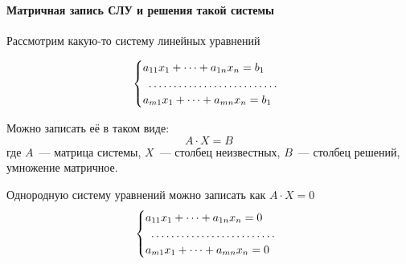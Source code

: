 \documentclass[12pt]{../../../notes}
\begin{document}
\paragraph{Матричная запись СЛУ и решения такой системы}
\begin{defn}\label{defn:matrslineq}
Рассмотрим какую-то систему линейных уравнений

\begin{equation}
  \begin{cases}
    a_{11} x_1 + \dotsb +a_{1n} x_n = b_1\\
    \hdotsfor{1} \\
    a_{m1} x_1 + \dotsb +a_{mn} x_n = b_1
  \end{cases}
  \label{eq:sleq}
\end{equation}

Можно записать её в таком виде:
\[
  A\cdot X = B
\]
где $A$~--- матрица системы, $X$~--- столбец неизвестных, $B$~--- столбец решений, умножение
матричное.

Однородную систему уравнений можно записать как $A\cdot X = 0$
\begin{equation}
  \begin{cases}
    a_{11} x_1 + \dotsb +a_{1n} x_n = 0\\
    \hdotsfor{1} \\
    a_{m1} x_1 + \dotsb +a_{mn} x_n = 0
  \end{cases}
  \label{eq:hsleq}
\end{equation}

\end{defn}
\end{document}

